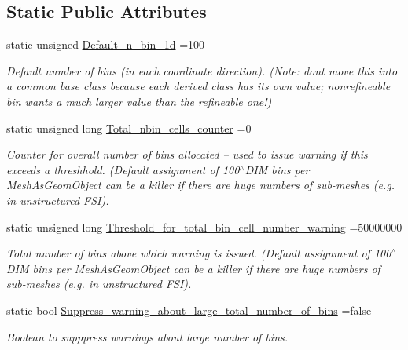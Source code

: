 \subsection*{Static Public Attributes}
\begin{DoxyCompactItemize}
\item 
static unsigned \hyperlink{classNonRefineableBinArray_ab6a79a3d17b5b7958e1a669a3780333a}{Default\+\_\+n\+\_\+bin\+\_\+1d} =100
\begin{DoxyCompactList}\small\item\em Default number of bins (in each coordinate direction). (Note\+: don\textquotesingle{}t move this into a common base class because each derived class has its own value; nonrefineable bin wants a much larger value than the refineable one!) \end{DoxyCompactList}\item 
static unsigned long \hyperlink{classNonRefineableBinArray_a1c6ff21c3d267b12fbfed4dbcaf7b55f}{Total\+\_\+nbin\+\_\+cells\+\_\+counter} =0
\begin{DoxyCompactList}\small\item\em Counter for overall number of bins allocated -- used to issue warning if this exceeds a threshhold. (Default assignment of 100$^\wedge$\+D\+IM bins per Mesh\+As\+Geom\+Object can be a killer if there are huge numbers of sub-\/meshes (e.\+g. in unstructured F\+SI). \end{DoxyCompactList}\item 
static unsigned long \hyperlink{classNonRefineableBinArray_adb9e92176f8fc319f5dcf82656ae57ee}{Threshold\+\_\+for\+\_\+total\+\_\+bin\+\_\+cell\+\_\+number\+\_\+warning} =50000000
\begin{DoxyCompactList}\small\item\em Total number of bins above which warning is issued. (Default assignment of 100$^\wedge$\+D\+IM bins per Mesh\+As\+Geom\+Object can be a killer if there are huge numbers of sub-\/meshes (e.\+g. in unstructured F\+SI). \end{DoxyCompactList}\item 
static bool \hyperlink{classNonRefineableBinArray_a0530530a5b790e7858c69237d5b4fa13}{Suppress\+\_\+warning\+\_\+about\+\_\+large\+\_\+total\+\_\+number\+\_\+of\+\_\+bins} =false
\begin{DoxyCompactList}\small\item\em Boolean to supppress warnings about large number of bins. \end{DoxyCompactList}\item 

\end{DoxyCompactItemize}
